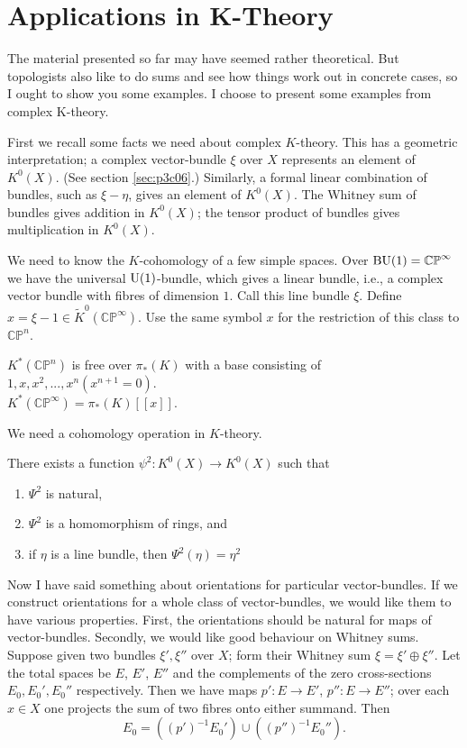 \documentclass[../main]{subfiles}
\begin{document}
\chapter{Applications in K-Theory}
\label{sec:p3c11}
The material presented so far may have seemed rather theoretical. But topologists also like to do sums and see how things work out in concrete cases, so I ought to show you some examples. I choose to present some examples from complex K-theory.
\par First we recall some facts we need about complex $K$-theory. This has a geometric interpretation; a complex vector-bundle $\xi$ over $X$ represents an element of $K^0(X)$. (See section \ref{sec:p3c06}.) Similarly, a formal linear combination of bundles, such as $\xi-\eta$, gives an element of $K^0(X)$. The Whitney sum of bundles gives addition in $K^0(X)$;  the tensor product of bundles gives multiplication in $K^0(X)$.
\par We need to know the $K$-cohomology of a few simple spaces. Over $\mathrm{BU}(1)=\mathbb{CP}^\infty$ we have the universal $\mathrm{U}(1)$-bundle, which gives a linear bundle, i.e., a complex vector bundle with fibres of dimension $1$. Call this line bundle $\xi$. Define $x=\xi - 1 \in \tilde{K}^0(\mathbb{CP}^\infty)$. Use the same symbol $x$ for the restriction of this class to $\mathbb{CP}^n$.
\begin{proposition}\label{prop:p3ch11.1}
$K^\ast (\mathbb{CP}^n)$ is free over $\pi_\ast (K)$ with a base consisting of $1,x,x^2,...,x^n (x^{n+1}=0)$. \\$K^\ast (\mathbb{CP}^\infty)=\pi_\ast (K)[[x]].$
\end{proposition}
\par We need a cohomology operation in $K$-theory.
\begin{proposition}\label{prop:p3ch11.2}
There exists a function $\psi^2:K^0(X)\longrightarrow K^0(X)$ such that \begin{enumerate}
    \item $\Psi^2$ is natural,
    \item $\Psi^2$ is a homomorphism of rings, and
    \item if $\eta$ is a line bundle, then $\Psi^2(\eta)=\eta^2$
\end{enumerate}
\end{proposition}
\par Now I have said something about orientations for particular vector-bundles. If we construct orientations for a whole class of vector-bundles, we would like them to have various properties. First, the orientations should be natural for maps of vector-bundles. Secondly, we would like good behaviour on Whitney sums. Suppose given two bundles $\xi',\xi''$ over $X$; form their Whitney sum $\xi=\xi'\oplus\xi''$. Let the total spaces be $E$, $E'$, $E''$ and the complements of the zero cross-sections $E_0, E_0', E_0''$ respectively. Then we have maps $p':E\longrightarrow E'$, $p'':E\longrightarrow E''$; over each $x\in X$ one projects the sum of two fibres onto either summand. Then \[E_0=((p')^{-1}E_0')\cup ((p'')^{-1}E_0'').\]
\end{document}
